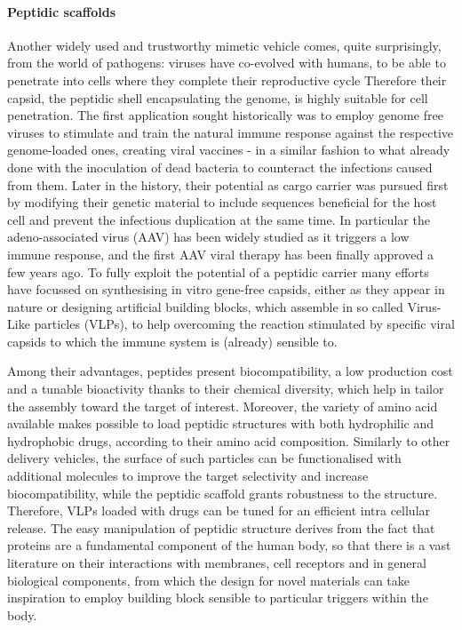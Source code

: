 \documentclass[a4paper,11pt]{extreport}
\begin{document}
\paragraph{Peptidic scaffolds} Another widely used and trustworthy mimetic vehicle comes, quite surprisingly, from the world of pathogens: viruses have co-evolved with humans, to be able to penetrate into cells where they complete their reproductive cycle\cite{??} Therefore their capsid, the peptidic shell encapsulating the genome, is highly suitable for cell penetration. The first application sought historically was to employ genome free viruses to stimulate and train the natural immune response against the respective genome-loaded ones, creating viral vaccines - in a similar fashion to what already done with the inoculation of dead bacteria to counteract the infections caused from them.\cite{Lauer2017}
Later in the history, their potential as cargo carrier was pursued first by modifying their genetic material to include sequences beneficial for the host cell and prevent the infectious duplication at the same time. In particular the adeno-associated virus (AAV) has been widely studied\cite{Daya2008} as it triggers a low immune response,\cite{Buning2015} and the first AAV viral therapy has been finally approved a few years ago.\cite{Smalley2017}
%
To fully exploit the potential of a peptidic carrier many efforts have focussed on synthesising in vitro gene-free capsids, either as they appear in nature\cite{Wu2009} or designing artificial building blocks, which assemble in  so called Virus-Like particles (VLPs), to help overcoming the reaction stimulated by specific viral capsids to which the immune system is (already) sensible to.

Among their advantages, peptides present biocompatibility, a low production cost and a tunable bioactivity thanks to their chemical diversity, which help in tailor the assembly toward the target of interest.\cite{Fan2017} Moreover, the variety of amino acid available makes possible to load peptidic structures with both hydrophilic and hydrophobic drugs, according to their amino acid composition.\cite{Habibi2016,Ma2012}
%
Similarly to other delivery vehicles, the surface of such particles can be functionalised with additional molecules to improve the target selectivity and increase biocompatibility, while the peptidic scaffold grants robustness to the structure. Therefore, VLPs loaded with drugs can be tuned for an efficient intra cellular release.\cite{Ma2012}
%
The easy manipulation of peptidic structure derives from the fact that proteins are a fundamental component of the human body, so that there is a vast literature on their interactions with membranes, cell receptors and in general biological components, from which the design for novel materials can take inspiration to employ building block sensible to particular triggers within the body.
\end{document}
